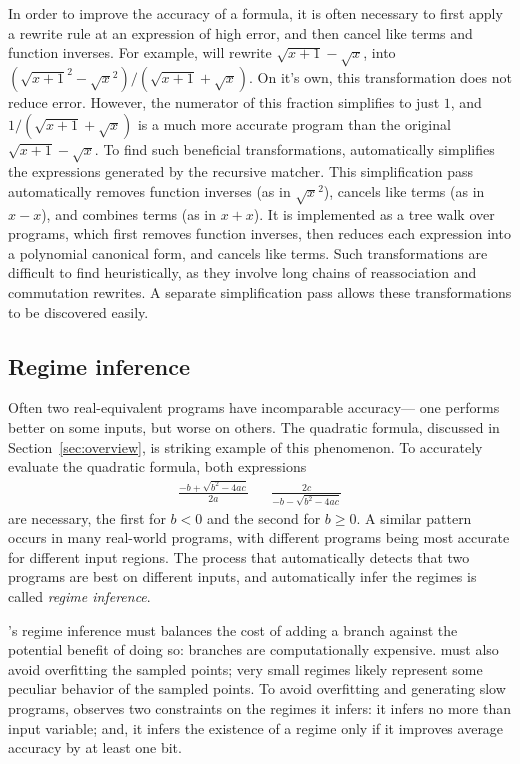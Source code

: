 \documentclass[paper.tex]{subfiles}
\begin{document}
In order to improve the accuracy of a formula,
  it is often necessary to first apply a rewrite rule
  at an expression of high error,
  and then cancel like terms and function inverses.
For example, \casio will rewrite $\sqrt{x+1} - \sqrt{x}$,
  into $(\sqrt{x+1}^2 - \sqrt{x}^2) / (\sqrt{x+1} + \sqrt{x})$.
On it's own, this transformation does not reduce error.
However, the numerator of this fraction simplifies to just $1$,
  and $1/(\sqrt{x+1} + \sqrt{x})$ is a much more accurate program
  than the original $\sqrt{x+1} - \sqrt{x}$.
To find such beneficial transformations,
  \casio automatically simplifies the expressions generated by the recursive matcher.
This simplification pass automatically
  removes function inverses (as in $\sqrt{x}^2$),
  cancels like terms (as in $x - x$),
  and combines terms (as in $x + x$).
It is implemented as a tree walk over programs,
  which first removes function inverses,
  then reduces each expression into a polynomial canonical form,
  and cancels like terms.
Such transformations are difficult to find heuristically, 
  as they involve long chains of reassociation and commutation rewrites.
A separate simplification pass allows these transformations
  to be discovered easily.

\subsection{Regime inference}

Often two real-equivalent programs have incomparable accuracy---%
  one performs better on some inputs, but worse on others.
The quadratic formula, discussed in Section~\ref{sec:overview},
  is striking example of this phenomenon.
To accurately evaluate the quadratic formula,
  both expressions
\begin{align*}
  \frac{-b + \sqrt{b^2 - 4 a c}}{2 a} &&
  \frac{2 c}{-b - \sqrt{b^2 - 4 a c}}
\end{align*}
  are necessary,
  the first for $b < 0$ and the second for $b \ge 0$.
A similar pattern occurs in many real-world programs,
  with different programs being most accurate
  for different input regions.
The process that automatically detects
  that two programs are best on different inputs,
  and automatically infer the regimes
  is called \emph{regime inference}.

\casio's regime inference must balances
  the cost of adding a branch against the potential benefit of doing so:
  branches are computationally expensive.
\casio must also avoid overfitting the sampled points;
  very small regimes likely represent
  some peculiar behavior of the sampled points.
To avoid overfitting and generating slow programs,
  \casio observes two constraints on the regimes it infers:
  it infers no more than \nRegimesper input variable;
  and, it infers the existence of a regime
  only if it improves average accuracy by at least one bit.
\end{document}
